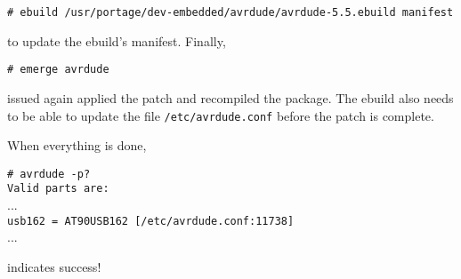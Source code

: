 \begin{center}
    \vspace{-\baselineskip}
    \begin{boxedminipage}[t]{\textwidth}
        \texttt{\# ebuild /usr/portage/dev-embedded/avrdude/avrdude-5.5.ebuild manifest}
    \end{boxedminipage}
\end{center}
to update the ebuild's manifest.  Finally,
\begin{center}
    \vspace{-\baselineskip}
    \begin{boxedminipage}[t]{\textwidth}
        \texttt{\# emerge avrdude}
    \end{boxedminipage}
\end{center}
issued again applied the patch and recompiled the package.  The ebuild
also needs to be able to update the file \texttt{/etc/avrdude.conf}
before the patch is complete.

When everything is done,
\begin{center}
    \vspace{-\baselineskip}
    \begin{boxedminipage}[t]{\textwidth}
        \texttt{\# avrdude -p?} \\
        \texttt{Valid parts are:}\\
        ...\\
        \texttt{usb162 = AT90USB162      [/etc/avrdude.conf:11738]}\\
        ...
    \end{boxedminipage}
\end{center}
indicates success!
